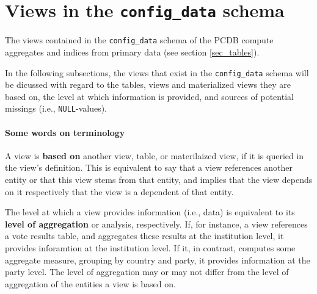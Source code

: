 \section{Views in the \texttt{config\_data} schema}\label{sec_views_in_config_data_schema}

The views contained in the \texttt{config\_data} schema of the PCDB compute aggregates and indices from primary data (see section \ref{sec_tables}).

In the following subsections, the views that exist in the \texttt{config\_data} schema will be dicussed with regard to the tables, views and materialized views they are based on, the level at which information is provided, and sources of potential missings (i.e., \texttt{NULL}-values).

\paragraph{Some words on terminology}
A view is {\bf based on} another view, table, or materilaized view, if it is queried in the view's definition. 
This is equivalent to say that a view references another entity or that this view stems from that entity, and implies that the view depends on it respectively that the view is a dependent of that entity.

The level at which a view provides information (i.e., data) is equivalent to its {\bf level of aggregation} or analysis, respectively. 
If, for instance, a view references a vote results table, and aggregates these results at the institution level, it provides inforamtion at the institution level.
If it, in contrast, computes some aggregate measure, grouping by country and party, it provides information at the party level.
The level of aggregation may or may not differ from the level of aggregation of the entities a view is based on.

    \newpage
    
    

		
		
		
		
		
		
		

		
		
		
		

		
		

		
		
